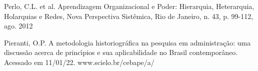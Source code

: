 \documentclass[
12pt,		%
openright,	%
twoside,  %
a4paper,			%
chapter=TITLE,		%
english,			%
french,				%
spanish,			%
brazil				%
]{USPSC-classe/USPSC}
\begin{document}
\begin{flushleft}
\begin{flushleft}
\begin{flushleft}
\begin{flushleft}
\begin{flushleft}
\begin{flushleft}
\begin{flushleft}
\begin{flushleft}
\begin{flushleft}
[PERLO et al., 2012] Perlo, C.L. et al. Aprendizagem Organizacional e Poder: Hierarquia, Heterarquia, Holarquias e Redes, Nova Perspectiva Sist\^emica, Rio de Janeiro, n. 43, p. 99-112, ago. 2012
\end{flushleft}


\end{flushleft}


\end{flushleft}


\end{flushleft}


\end{flushleft}


\end{flushleft}


\end{flushleft}


\end{flushleft}


\end{flushleft}


\begin{flushleft}
\begin{flushleft}
\begin{flushleft}
\begin{flushleft}
\begin{flushleft}
\begin{flushleft}
\begin{flushleft}
\begin{flushleft}
\begin{flushleft}
[PIERANTI, 2022] Pieranti, O.P. A metodologia historiogr\'afica na pesquisa em administra\c{c}\~ao: uma discuss\~ao acerca de princ\'{\i}pios e sua aplicabilidade no Brasil contempor\^aneo. Acessado em 11/01/22. www.scielo.br/cebape/a/
\end{flushleft}


\end{flushleft}


\end{flushleft}


\end{flushleft}


\end{flushleft}


\end{flushleft}


\end{flushleft}


\end{flushleft}


\end{flushleft}
\end{document}
